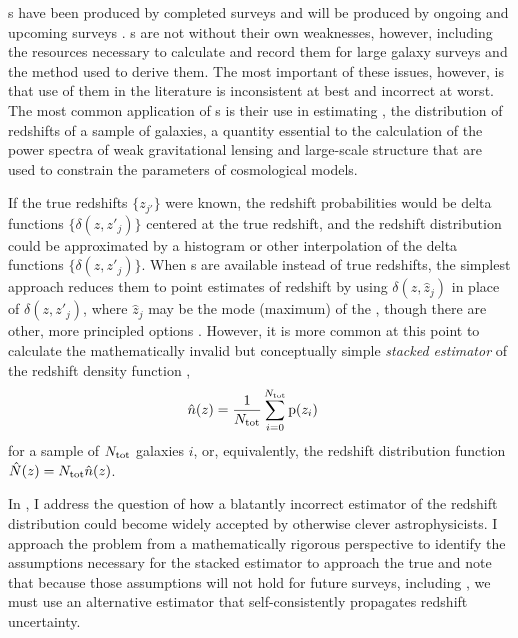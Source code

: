 \Pzpdf s have been produced by completed surveys \citep{Hildebrandt2012, Sheldon2012} and will be produced by ongoing and upcoming surveys \citep{LSSTScienceCollaboration2009, CarrascoKind2014a, Bonnett2015, Masters2015}.  
\Pzpdf s are not without their own weaknesses, however, including the resources necessary to calculate and record them for large galaxy surveys \citep{CarrascoKind2014} and the method used to derive them.  
The most important of these issues, however, is that use of them in the literature is inconsistent at best and incorrect at worst.  
The most common application of \pzpdf s is their use in estimating \Nz, the distribution of redshifts of a sample of galaxies, a quantity essential to the calculation of the power spectra of weak gravitational lensing and large-scale structure that are used to constrain the parameters of cosmological models.

If the true redshifts $\{z_{j'}\}$ were known, the redshift probabilities would be delta functions $\{\delta(z, z'_{j})\}$ centered at the true redshift, and the redshift distribution could be approximated by a histogram or other interpolation of the delta functions $\{\delta(z, z'_{j})\}$.
When \pzpdf s are available instead of true redshifts, the simplest approach reduces them to point estimates of redshift by using $\delta(z, \hat{z}_{j})$ in place of $\delta(z, z'_{j})$, where $\hat{z}_{j}$ may be the mode (maximum) of the \pzpdf, though there are other, more principled options \citep{tanaka_photometric_2018-1}.
However, it is more common at this point to calculate the mathematically invalid but conceptually simple \textit{stacked estimator} of the redshift density function \citep{Lima2008}, 
\begin{align}
\eqlabel{eqn:stack}
\hat{n}(z) &= \frac{1}{\ntot} \sum_{i = 0}^{\ntot} \pr{z_{i}}
\end{align}
for a sample of $N_{\mathrm{tot}}$ galaxies $i$, or, equivalently, the redshift distribution function $\hat{N}(z) = N_{\mathrm{tot}} \hat{n}(z)$.

In , I address the question of how a blatantly incorrect estimator of the redshift distribution could become widely accepted by otherwise clever astrophysicists.
I approach the problem from a mathematically rigorous perspective to identify the assumptions necessary for the stacked estimator to approach the true \Nz and note that because those assumptions will not hold for future surveys, including \lsst, we must use an alternative estimator that self-consistently propagates redshift uncertainty.

